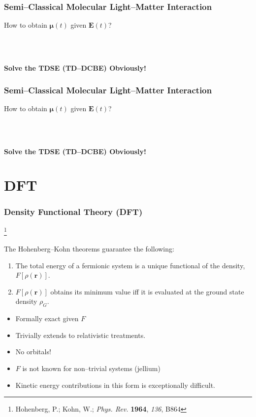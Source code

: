 \documentclass{beamer}
\newcommand\blfootnote[1]{%
  \begingroup
  \renewcommand\thefootnote{}\footnote{#1}%
  \addtocounter{footnote}{-1}%
  \endgroup
}
\begin{document}
\begin{frame}
\frametitle{Semi--Classical Molecular Light--Matter Interaction}
\begin{center} 
\LARGE How to obtain $\boldsymbol{\mu}(t)$ given $\mathbf{E}(t)$?
\end{center}
~\\
~\\
\begin{center}
\LARGE \bf \color{white}
Solve the TDSE (TD--DCBE) Obviously! 
\end{center}
\end{frame}

\begin{frame}
\frametitle{Semi--Classical Molecular Light--Matter Interaction}
\begin{center} 
\LARGE How to obtain $\boldsymbol{\mu}(t)$ given $\mathbf{E}(t)$?
\end{center}
~\\
~\\
\begin{center}
\LARGE \bf
Solve the TDSE (TD--DCBE) Obviously! 
\end{center}
\end{frame}

\section{DFT}

\begin{frame}
\frametitle{Density Functional Theory (DFT)}
\blfootnote{Hohenberg, P.; Kohn, W.; \emph{Phys. Rev.} \textbf{1964}, \emph{136}, B864}

The Hohenberg--Kohn theorems guarantee the following:
\begin{enumerate}
  \item The total energy of a fermionic system is a unique functional of the density, $F[\rho(\mathbf{r})]$.
  \item $F[\rho(\mathbf{r})]$ obtains its minimum value iff it is evaluated at the ground state density $\rho_G$.
\end{enumerate}

\begin{itemize}
  \color{white}
  \item[\color{white}] Formally exact given $F$
  \item[\color{white}] Trivially extends to relativistic treatments.
  \item[\color{white}] No orbitals!
\end{itemize}

\begin{itemize}
  \color{white}
  \item[\color{white}] $F$ is not known for non--trivial systems (jellium)
  \item[\color{white}] Kinetic energy contributions in this form is exceptionally difficult.
\end{itemize}

\end{frame}
\end{document}
